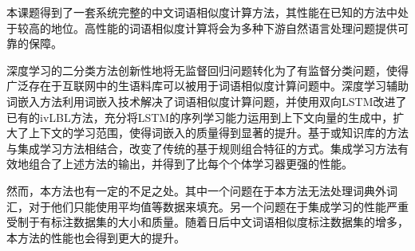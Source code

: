 

本课题得到了一套系统完整的中文词语相似度计算方法，其性能在已知的方法中处于较高的地位。高性能的词语相似度计算将会为多种下游自然语言处理问题提供可靠的保障。

深度学习的二分类方法创新性地将无监督回归问题转化为了有监督分类问题，使得广泛存在于互联网中的生语料库可以被用于词语相似度计算问题中。深度学习辅助词嵌入方法利用词嵌入技术解决了词语相似度计算问题，并使用双向LSTM改进了已有的ivLBL方法，充分将LSTM的序列学习能力运用到上下文向量的生成中，扩大了上下文的学习范围，使得词嵌入的质量得到显著的提升。基于或知识库的方法与集成学习方法相结合，改变了传统的基于规则组合特征的方式。集成学习方法有效地组合了上述方法的输出，并得到了比每个个体学习器更强的性能。

然而，本方法也有一定的不足之处。其中一个问题在于本方法无法处理词典外词汇，对于他们只能使用平均值等数据来填充。另一个问题在于集成学习的性能严重受制于有标注数据集的大小和质量。随着日后中文词语相似度标注数据集的增多，本方法的性能也会得到更大的提升。